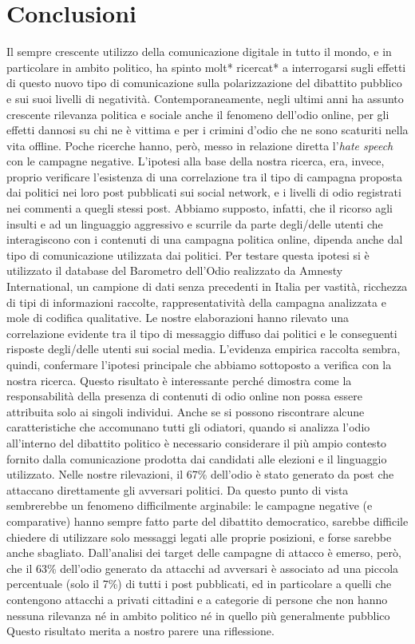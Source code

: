\chapter{Conclusioni}
\label{chap:conclusioni}
Il sempre crescente utilizzo della comunicazione digitale in tutto il mondo, e in particolare in ambito politico, ha spinto molt* ricercat* a interrogarsi sugli effetti di questo nuovo tipo di comunicazione sulla polarizzazione del dibattito pubblico e sui suoi livelli di negatività.
Contemporaneamente, negli ultimi anni ha assunto crescente rilevanza politica e sociale anche il fenomeno dell’odio online, per gli effetti dannosi su chi ne è vittima e per i crimini d'odio che ne sono scaturiti nella vita offline.
Poche ricerche hanno, però, messo in relazione diretta l'\textit{hate speech} con le campagne negative. L’ipotesi alla base della nostra ricerca, era, invece, proprio verificare l’esistenza di una correlazione tra il tipo di campagna proposta dai politici nei loro post pubblicati sui social network, e i livelli di odio registrati nei commenti a quegli stessi post. Abbiamo supposto, infatti, che il ricorso agli insulti e ad un linguaggio aggressivo e scurrile da parte degli/delle utenti che interagiscono con i contenuti di una campagna politica online, dipenda anche dal tipo di comunicazione utilizzata dai politici.
Per testare questa ipotesi si è utilizzato il database del Barometro dell’Odio realizzato da Amnesty International, un campione di dati senza precedenti in Italia per vastità, ricchezza di tipi di informazioni raccolte, rappresentatività della campagna analizzata e mole di codifica qualitative. Le nostre elaborazioni hanno rilevato una correlazione evidente tra il tipo di messaggio diffuso dai politici e le conseguenti risposte degli/delle utenti sui social media. L’evidenza empirica raccolta sembra, quindi, confermare l’ipotesi principale che abbiamo sottoposto a verifica con la nostra ricerca.
Questo risultato è interessante perché dimostra come la responsabilità della presenza di contenuti di odio online non possa essere attribuita solo ai singoli individui. Anche se  si possono riscontrare alcune caratteristiche che accomunano tutti gli odiatori, quando si analizza l’odio all’interno del dibattito politico è necessario considerare il più ampio contesto fornito dalla comunicazione prodotta dai candidati alle elezioni e il linguaggio utilizzato.
Nelle nostre rilevazioni, il 67\% dell'odio è stato generato da post che attaccano direttamente gli avversari politici. Da questo punto di vista sembrerebbe un fenomeno difficilmente arginabile: le campagne negative (e comparative) hanno sempre fatto parte del dibattito democratico, sarebbe difficile chiedere di utilizzare solo messaggi legati alle proprie posizioni, e forse sarebbe anche sbagliato. Dall’analisi dei target delle campagne di attacco è emerso, però, che il 63\% dell'odio generato da attacchi ad avversari è associato ad una piccola percentuale (solo il 7\%) di tutti i post pubblicati, ed in particolare a quelli che contengono attacchi a privati cittadini e a categorie di persone che non hanno nessuna rilevanza né in ambito politico né in quello più generalmente pubblico Questo risultato merita a nostro parere una riflessione.
